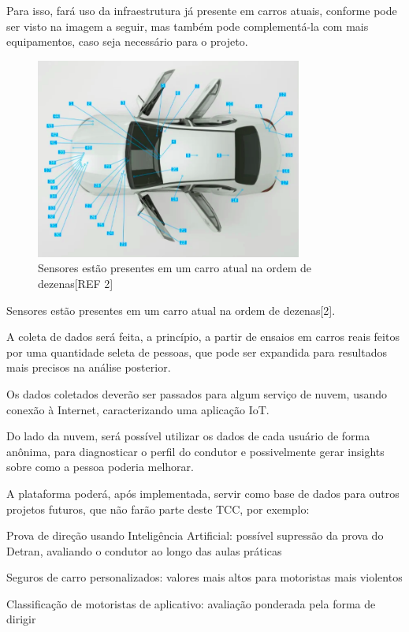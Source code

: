 Para isso, fará uso da infraestrutura já presente em carros atuais, conforme pode ser visto na imagem a seguir, mas também pode complementá-la com mais equipamentos, caso seja necessário para o projeto.


\begin{figure}[hp]
    \centering
    
    \includegraphics[]{figures/sensores_carro.png}
    
    \caption{Sensores estão presentes em um carro atual na ordem de dezenas[REF 2]}
\end{figure}

Sensores estão presentes em um carro atual na ordem de dezenas[2].

A coleta de dados será feita, a princípio, a partir de ensaios em carros reais feitos por uma quantidade seleta de pessoas, que pode ser expandida para resultados mais precisos na análise posterior.

Os dados coletados deverão ser passados para algum serviço de nuvem, usando conexão à Internet, caracterizando uma aplicação IoT.
	
Do lado da nuvem, será possível utilizar os dados de cada usuário de forma anônima, para diagnosticar o perfil do condutor e possivelmente gerar insights sobre como a pessoa poderia melhorar.
	
A plataforma poderá, após implementada, servir como base de dados para outros projetos futuros, que não farão parte deste TCC, por exemplo:

Prova de direção usando Inteligência Artificial: possível supressão da prova do Detran, avaliando o condutor ao longo das aulas práticas

Seguros de carro personalizados: valores mais altos para motoristas mais violentos

Classificação de motoristas de aplicativo: avaliação ponderada pela forma de dirigir

